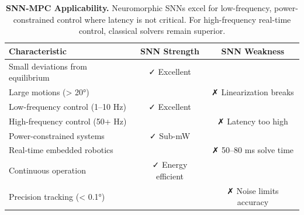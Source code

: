 \begin{table}[H]
\centering
\small
\begin{tabular}{lcc}
\toprule
\textbf{Characteristic} & \textbf{SNN Strength} & \textbf{SNN Weakness} \\
\midrule
Small deviations from equilibrium & ✓ Excellent & \\
Large motions (> 20°) & & ✗ Linearization breaks \\
Low-frequency control (1--10 Hz) & ✓ Excellent & \\
High-frequency control (50+ Hz) & & ✗ Latency too high \\
Power-constrained systems & ✓ Sub-mW & \\
Real-time embedded robotics & & ✗ 50--80 ms solve time \\
Continuous operation & ✓ Energy efficient & \\
Precision tracking (< 0.1°) & & ✗ Noise limits accuracy \\
\bottomrule
\end{tabular}
\caption{\textbf{SNN-MPC Applicability.} Neuromorphic SNNs excel for low-frequency, power-constrained control where latency is not critical. For high-frequency real-time control, classical solvers remain superior.}
\label{tab:snn-mpc-applicability}
\end{table}

